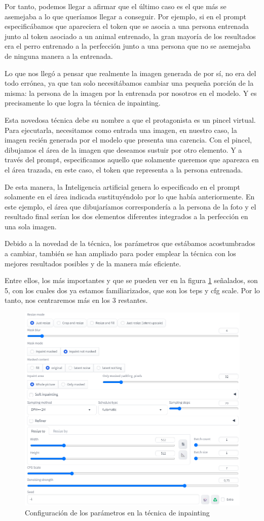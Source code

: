 Por tanto, podemos llegar a afirmar que el último caso es el que más se asemejaba a lo que queríamos llegar a conseguir. Por ejemplo, si en el prompt especificábamos que apareciera el token que se asocia a una persona entrenada junto al token asociado a un animal entrenado, la gran mayoría de los resultados era el perro entrenado a la perfección junto a una persona que no se asemejaba de ninguna manera a la entrenada.  

Lo que nos llegó a pensar que realmente la imagen generada de por sí, no era del todo errónea, ya que tan solo necesitábamos cambiar una pequeña porción de la misma: la persona de la imagen por la entrenada por nosotros en el modelo. Y es precisamente lo que logra la técnica de inpainting. 

Esta novedosa técnica debe su nombre a que el protagonista es un pincel virtual. Para ejecutarla, necesitamos como entrada una imagen, en nuestro caso, la imagen recién generada por el modelo que presenta una carencia. Con el pincel, dibujamos el área de la imagen que deseamos sustuir por otro elemento. Y a través del prompt, especificamos aquello que solamente queremos que aparezca en el área trazada, en este caso, el token que representa a la persona entrenada. 

De esta manera, la Inteligencia artificial genera lo especificado en el prompt solamente en el área indicada sustituyéndolo por lo que había anteriormente. En este ejemplo, el área que dibujaríamos correspondería a la persona de la foto y el resultado final serían los dos elementos diferentes integrados a la perfección en una sola imagen. 

Debido a la novedad de la técnica, los parámetros que estábamos acostumbrados a cambiar, también se han ampliado para poder emplear la técnica con los mejores resultados posibles y de la manera más eficiente. 

Entre ellos, los más importantes y que se pueden ver en la figura \ref{fig:paramsinpainting} señalados, son 5, con los cuales dos ya estamos familiarizados, que son los teps y cfg scale. Por lo tanto, nos centraremos más en los 3 restantes. 

\begin{figure}[h]
	\centering
	\includegraphics[width = 0.6
	\textwidth]{Imagenes/Vectorial/parametrosinpainting.png}
	\caption{Configuración de los parámetros en la técnica de inpainting}
	\label{fig:paramsinpainting}
\end{figure}

